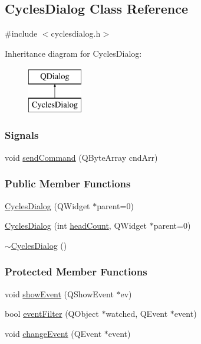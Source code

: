 \hypertarget{classCyclesDialog}{}\subsection{Cycles\+Dialog Class Reference}
\label{classCyclesDialog}
{\ttfamily \#include $<$cyclesdialog.\+h$>$}

Inheritance diagram for Cycles\+Dialog\+:\begin{figure}[H]
\begin{center}
\leavevmode
\includegraphics[height=2.000000cm]{classCyclesDialog}
\end{center}
\end{figure}
\subsubsection*{Signals}
\begin{DoxyCompactItemize}
\item 
void \mbox{\hyperlink{classCyclesDialog_a6dabe9aeecfb9264a4b6014d74241432}{send\+Command}} (Q\+Byte\+Array cnd\+Arr)
\end{DoxyCompactItemize}
\subsubsection*{Public Member Functions}
\begin{DoxyCompactItemize}
\item 
\mbox{\hyperlink{classCyclesDialog_a0fa891942095d90fef41ec6aa8fa3860}{Cycles\+Dialog}} (Q\+Widget $\ast$parent=0)
\item 
\mbox{\hyperlink{classCyclesDialog_a3eeb8a5c3baba2d43c604981cb3eceaa}{Cycles\+Dialog}} (int \mbox{\hyperlink{classCyclesDialog_aaa0b334934a65c2bf2ef231a31199779}{head\+Count}}, Q\+Widget $\ast$parent=0)
\item 
\mbox{\hyperlink{classCyclesDialog_ad4da02e07b34c1d7e4aaad3bffab2246}{$\sim$\+Cycles\+Dialog}} ()
\end{DoxyCompactItemize}
\subsubsection*{Protected Member Functions}
\begin{DoxyCompactItemize}
\item 
void \mbox{\hyperlink{classCyclesDialog_a43494fe7c65472212974a7be28a31d3d}{show\+Event}} (Q\+Show\+Event $\ast$ev)
\item 
bool \mbox{\hyperlink{classCyclesDialog_a5a20052e29f7530886dded1e06bc5afd}{event\+Filter}} (Q\+Object $\ast$watched, Q\+Event $\ast$event)
\item 
void \mbox{\hyperlink{classCyclesDialog_a3d1b7bb4af1e286adadf2483cb0e4dfe}{change\+Event}} (Q\+Event $\ast$event)
\end{DoxyCompactItemize}
